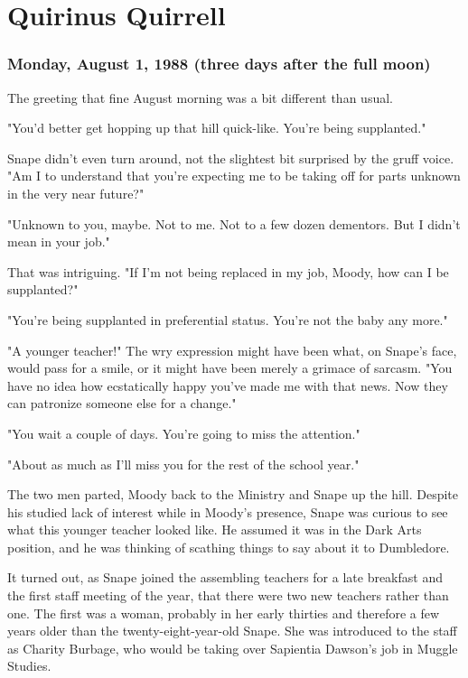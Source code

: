 
\chapter{Quirinus Quirrell}

\subsection{Monday, August 1, 1988 (three days after the full moon)}

The greeting that fine August morning was a bit different than usual.

"You'd better get hopping up that hill quick-like. You're being supplanted."

Snape didn't even turn around, not the slightest bit surprised by the gruff voice. "Am I to understand that you're expecting me to be taking off for parts unknown in the very near future?"

"Unknown to you, maybe. Not to me. Not to a few dozen dementors. But I didn't mean in your job."

That was intriguing. "If I'm not being replaced in my job, Moody, how can I be supplanted?"

"You're being supplanted in preferential status. You're not the baby any more."

"A younger teacher!" The wry expression might have been what, on Snape's face, would pass for a smile, or it might have been merely a grimace of sarcasm. "You have no idea how ecstatically happy you've made me with that news. Now they can patronize someone else for a change."

"You wait a couple of days. You're going to miss the attention."

"About as much as I'll miss you for the rest of the school year."

The two men parted, Moody back to the Ministry and Snape up the hill. Despite his studied lack of interest while in Moody's presence, Snape was curious to see what this younger teacher looked like. He assumed it was in the Dark Arts position, and he was thinking of scathing things to say about it to Dumbledore.

It turned out, as Snape joined the assembling teachers for a late breakfast and the first staff meeting of the year, that there were two new teachers rather than one. The first was a woman, probably in her early thirties and therefore a few years older than the twenty-eight-year-old Snape. She was introduced to the staff as Charity Burbage, who would be taking over Sapientia Dawson's job in Muggle Studies.

